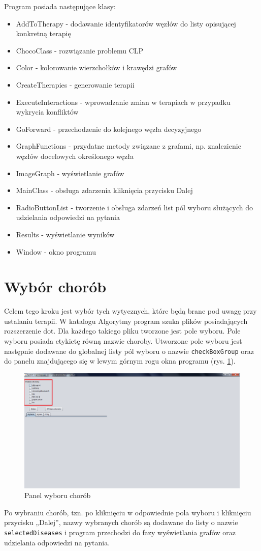 Program posiada następujące klasy:
\begin{itemize}
\item{AddToTherapy - dodawanie identyfikatorów węzłów do listy opisującej konkretną terapię}
\item{ChocoClass - rozwiązanie problemu CLP}
\item{Color - kolorowanie wierzchołków i krawędzi grafów}
\item{CreateTherapies - generowanie terapii}
\item{ExecuteInteractions - wprowadzanie zmian w terapiach w przypadku wykrycia konfliktów}
\item{GoForward - przechodzenie do kolejnego węzła decyzyjnego}
\item{GraphFunctions - przydatne metody związane z grafami, np. znalezienie węzłów docelowych określonego węzła}
\item{ImageGraph - wyświetlanie grafów}
\item{MainClass - obsługa zdarzenia kliknięcia przycisku Dalej}
\item{RadioButtonList - tworzenie i obsługa zdarzeń list pól wyboru służących do udzielania odpowiedzi na pytania}
\item{Results - wyświetlanie wyników}
\item{Window - okno programu}
\end{itemize}

\section{Wybór chorób}
Celem tego kroku jest wybór tych wytycznych, które będą brane pod uwagę przy ustalaniu terapii. W katalogu Algorytmy program szuka plików posiadających rozszerzenie dot. Dla każdego takiego pliku tworzone jest pole wyboru. Pole wyboru posiada etykietę równą nazwie choroby. Utworzone pole wyboru jest następnie dodawane do globalnej listy pól wyboru o nazwie \texttt{checkBoxGroup} oraz do panelu 
znajdującego się w lewym górnym rogu okna programu (rys. \ref{fig:wybor_chorob}). 
\begin{figure}[H]
\centering
\includegraphics[width=\textwidth]{img/wybor_chorob.png}
\caption{Panel wyboru chorób}
\label{fig:wybor_chorob}
\end{figure}
Po wybraniu chorób, tzn. po kliknięciu w odpowiednie pola wyboru i kliknięciu przycisku „Dalej”, nazwy wybranych chorób są dodawane do listy o nazwie \texttt{selectedDiseases} i program przechodzi do fazy wyświetlania grafów oraz udzielania odpowiedzi na pytania. 

